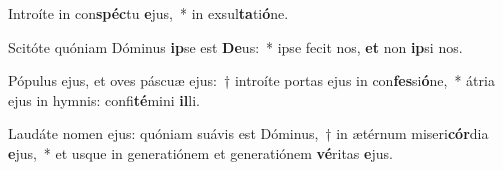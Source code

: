 \item Introíte in con\textbf{spéc}tu \textbf{e}jus,~* in exsul\textbf{ta}ti\textbf{ó}ne.
\item Scitóte quóniam Dóminus \textbf{ip}se est \textbf{De}us:~* ipse fecit nos, \textbf{et} non \textbf{ip}si nos.
\item Pópulus ejus, et oves páscuæ ejus:~† introíte portas ejus in con\textbf{fes}si\textbf{ó}ne,~* átria ejus in hymnis: confi\textbf{té}mini \textbf{il}li.
\item Laudáte nomen ejus: quóniam suávis est Dóminus,~† in ætérnum miseri\textbf{cór}dia \textbf{e}jus,~* et usque in generatiónem et generatiónem \textbf{vé}ritas \textbf{e}jus.
